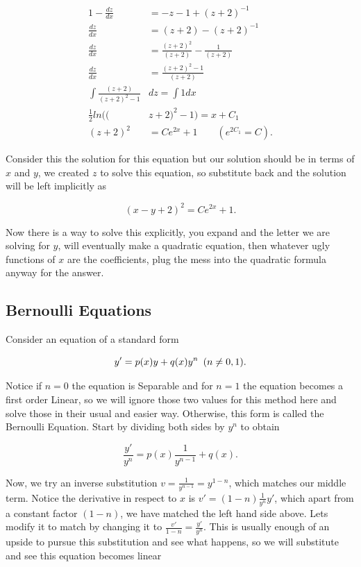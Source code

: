 \documentclass[12pt]{article}
\begin{document}
\begin{align*}
    1-\frac{dz}{dx} &= -z-1+(z+2)^{-1} \\
    \frac{dz}{dx} &= (z+2)-(z+2)^{-1} \\
    \frac{dz}{dx} &= \frac{(z+2)^2}{(z+2)}-\frac{1}{(z+2)} \\
    \frac{dz}{dx} &= \frac{(z+2)^2-1}{(z+2)} \\
    \int \frac{(z+2)}{(z+2)^2-1}& dz = \int 1 dx \\
    \frac{1}{2} ln((&z+2)^2-1) = x+C_1 \\
    (z+2)^2&=Ce^{2x}+1 \qquad (e^{2C_1}=C).
\end{align*}

Consider this the solution for this equation but our solution should be in terms of $x$ and $y$, we created $z$ to solve this equation, so substitute back and the solution will be left implicitly as

\begin{equation*}
    (x-y+2)^2 = Ce^{2x}+1.
\end{equation*}

Now there is a way to solve this explicitly, you expand and the letter we are solving for $y$, will eventually make a quadratic equation, then whatever ugly functions of $x$ are the coefficients, plug the mess into the quadratic formula anyway for the answer.

\subsection{Bernoulli Equations}

Consider an equation of a standard form

\begin{equation*}
    y' = p(x)y+q(x)y^n \hspace{5 pt} (n \ne 0,1).
\end{equation*}

Notice if $n=0$ the equation is Separable and for $n=1$ the equation becomes a first order Linear, so we will ignore those two values for this method here and solve those in their usual and easier way. Otherwise, this form is called the Bernoulli Equation. Start by dividing both sides by $y^n$ to obtain

\begin{equation*}
    \frac{y'}{y^n} = p(x)\frac{1}{y^{n-1}}+q(x).
\end{equation*}

Now, we try an inverse substitution $v=\frac{1}{y^{n-1}}=y^{1-n}$, which matches our middle term. Notice the derivative in respect to $x$ is $v'=(1-n)\frac{1}{y^n}y'$, which apart from a constant factor $(1-n)$, we have matched the left hand side above. Lets modify it to match by changing it to $\frac{v'}{1-n}=\frac{y'}{y^n}$. This is usually enough of an upside to pursue this substitution and see what happens, so we will substitute and see this equation becomes linear
\end{document}
